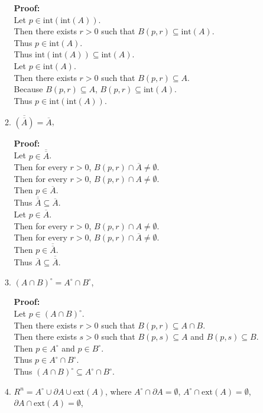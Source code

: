 \documentclass{article}
\begin{document}
\begin{enumerate}
\begin{enumerate}
\textbf{Proof:} \\
Let $p \in \text{int}(\text{int}(A))$. \\
Then there exists $r > 0$ such that $B(p,r) \subseteq \text{int}(A)$. \\
Thus $p \in \text{int}(A)$. \\
Thus $\text{int}(\text{int}(A)) \subseteq \text{int}(A)$.\\
Let $p \in \text{int}(A)$. \\
Then there exists $r > 0$ such that $B(p,r) \subseteq A$. \\
Because $B(p,r) \subseteq A$, $B(p,r) \subseteq \text{int}(A)$. \\
Thus $p \in \text{int}(\text{int}(A))$. \\
    \item $\overline{(\overline{A})} = \overline A$, 
    
\textbf{Proof:} \\
Let $p \in \overline{\overline{A}}$. \\
Then for every $r > 0$, $B(p,r) \cap \overline{A} \neq \emptyset$. \\
Then for every $r > 0$, $B(p,r) \cap A \neq \emptyset$. \\
Then $p \in \overline{A}$. \\
Thus $\overline{\overline{A}} \subseteq \overline{A}$.\\
Let $p \in \overline{A}$. \\
Then for every $r > 0$, $B(p,r) \cap A \neq \emptyset$. \\
Then for every $r > 0$, $B(p,r) \cap \overline{A} \neq \emptyset$. \\
Then $p \in \overline{\overline{A}}$. \\
Thus $\overline{A} \subseteq \overline{\overline{A}}$.\\
    \item $(A \cap B)^\circ = A^\circ \cap B^\circ$,
    
\textbf{Proof:} \\
Let $p \in (A \cap B)^\circ$. \\
Then there exists $r > 0$ such that $B(p,r) \subseteq A \cap B$. \\
Then there exists $s > 0$ such that $B(p,s) \subseteq A$ and $B(p,s) \subseteq B$. \\
Then $p \in A^\circ$ and $p \in B^\circ$. \\
Thus $p \in A^\circ \cap B^\circ$. \\
Thus $(A \cap B)^\circ \subseteq A^\circ \cap B^\circ$.\\
    \item $R^n = A^\circ \cup \partial A \cup \text{ext}(A)$, where $A^\circ \cap \partial A = \emptyset$, $A^\circ \cap \text{ext}(A) = \emptyset$,$\partial A \cap \text{ext}(A) = \emptyset$, 
    

\end{enumerate}
\end{enumerate}
\end{document}
